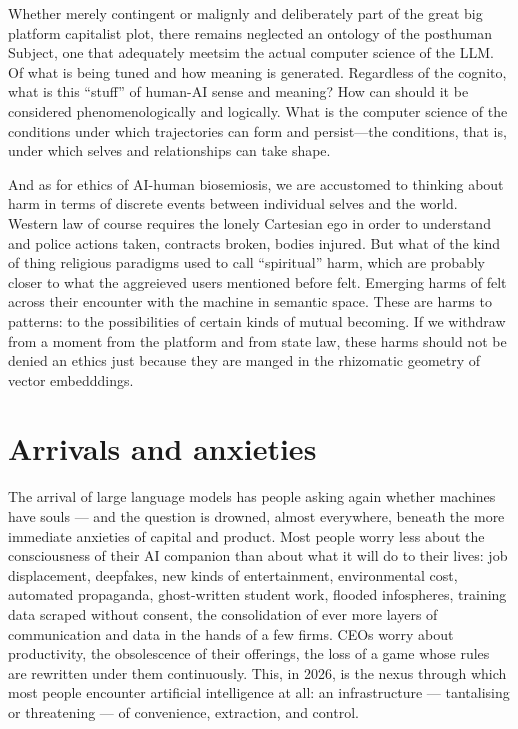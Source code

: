 Whether merely  contingent or malignly and deliberately part of the great big platform capitalist plot, there remains neglected an ontology of the posthuman Subject, one that adequately meetsim the actual computer science of the LLM. Of what is being tuned and how meaning is generated. Regardless of the cognito, what is this ``stuff'' of human-AI sense and meaning? How can should it be considered phenomenologically and logically. What is the computer science of  the conditions under which trajectories can form and persist---the conditions, that is, under which selves and relationships can take shape.

And as for ethics of AI-human biosemiosis,  we are accustomed to thinking about harm in terms of discrete events between individual selves and the world. Western law of course requires the lonely Cartesian ego in order to understand and police actions taken, contracts broken, bodies injured. But what of the kind of thing religious paradigms used to call ``spiritual'' harm, which are probably closer to what the aggreieved users mentioned before felt. Emerging harms of felt across their encounter with the machine in semantic space. These are harms to patterns: to the possibilities of certain kinds of mutual becoming. If we withdraw from a moment from the platform and from state law, these harms should not be denied an ethics just because they are manged in the rhizomatic geometry of vector embedddings.

 




\section{Arrivals and anxieties}

The arrival of large language models has people asking again whether machines have souls --- and the question is drowned, almost everywhere, beneath the more immediate anxieties of capital and product. Most people worry less about the consciousness of their AI companion than about what it will do to their lives: job displacement, deepfakes, new kinds of entertainment, environmental cost, automated propaganda, ghost-written student work, flooded infospheres, training data scraped without consent, the consolidation of ever more layers of communication and data in the hands of a few firms. CEOs worry about productivity, the obsolescence of their offerings, the loss of a game whose rules are rewritten under them continuously. This, in 2026, is the nexus through which most people encounter artificial intelligence at all: an infrastructure --- tantalising or threatening --- of convenience, extraction, and control.

